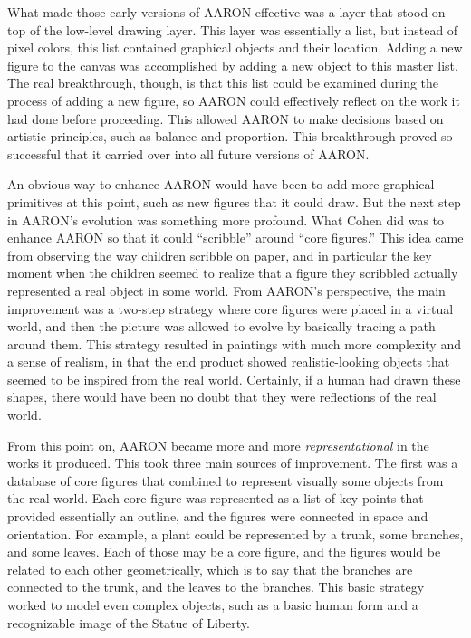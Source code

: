 What made those early versions of AARON effective was a layer that
stood on top of the low-level drawing layer. This layer was essentially
a list, but instead of pixel colors, this list contained graphical objects 
and their location. Adding a new figure to the canvas was accomplished
by adding a new object to this master list. The real breakthrough, 
though, is that this list could be examined during the process of adding
a new figure, so AARON could effectively reflect on the work it had
done before proceeding. This allowed AARON to make decisions based on
artistic principles, such as balance and proportion. This breakthrough
proved so successful that it carried over into all future versions of
AARON.

An obvious way to enhance AARON would have been to add more graphical
primitives at this point, such as new figures that it could draw. But 
the next step in AARON's evolution was something more profound. What
Cohen did was to enhance AARON so that it could ``scribble'' around
``core figures.'' This idea came from observing the way children 
scribble on paper, and in particular the key moment when the children
seemed to realize that a figure they scribbled actually represented a
real object in some world. From AARON's perspective, the main improvement
was a two-step strategy where core figures were placed in a virtual world, 
and then the picture was allowed to evolve by basically tracing a path
around them. This strategy resulted in paintings with much more complexity
and a sense of realism, in that the end product showed realistic-looking
objects that seemed to be inspired from the real world. Certainly, if a
human had drawn these shapes, there would have been no doubt that they
were reflections of the real world.

From this point on, AARON became more and more \emph{representational} in
the works it produced. This took three main sources of improvement. The first
was a database of core figures that combined to represent visually some
objects from the real world. Each core figure was represented as a list of
key points that provided essentially an outline, and the figures were connected
in space and orientation.
For example, a plant could be represented by
a trunk, some branches, and some leaves. Each of those may be a core figure,
and the figures would be related to each other geometrically, which is to say
that the branches are connected to the trunk, and the leaves to the branches.
This basic strategy worked to model even complex objects, such as a basic human
form and a recognizable image of the Statue of Liberty.

